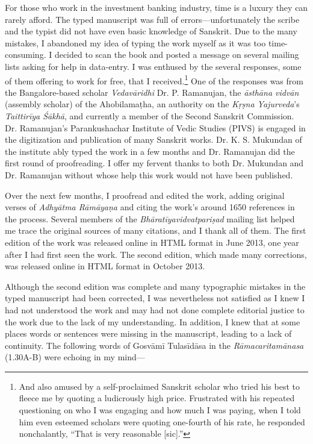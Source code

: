 \begin{sloppypar}\justifying\noindent\hspace{10mm} {\engtextfont For those who work in the investment banking industry, time is a luxury they can rarely afford. The typed manuscript was full of errors—unfortunately the scribe and the typist did not have even basic knowledge of Sanskrit. Due to the many mistakes, I abandoned my idea of typing the work myself as it was too time-consuming. I decided to scan the book and posted a message on several mailing lists asking for help in data-entry. I was enthused by the several responses, some of them offering to work for free, that I received.\footnote{{\engtextfont And also amused by a self-proclaimed Sanskrit scholar who tried his best to fleece me by quoting a ludicrously high price. Frustrated with his repeated questioning on who I was engaging and how much I was paying, when I told him even esteemed scholars were quoting one-fourth of his rate, he responded nonchalantly, “That is very reasonable [sic].”}} One of the responses was from the Bangalore-based scholar \textit{Vedavāridhi} Dr. P. Ramanujan, the \textit{āsthāna vidvān} (assembly scholar) of the Ahobilamaṭha, an authority on the \textit{Kṛṣna Yajurveda}’s \textit{Taittirīya Śākhā}, and currently a member of the Second Sanskrit Commission. Dr. Ramanujan’s Parankushachar Institute of Vedic Studies (PIVS) is engaged in the digitization and publication of many Sanskrit works. Dr. K. S. Mukundan of the institute ably typed the work in a few months and Dr. Ramanujan did the first round of proofreading. I offer my fervent thanks to both Dr. Mukundan and Dr. Ramanujan without whose help this work would not have been published.}\end{sloppypar}
\begin{sloppypar}\justifying\noindent\hspace{10mm} {\engtextfont Over the next few months, I proofread and edited the work, adding original verses of \textit{Adhyātma Rāmāyaṇa} and citing the work’s around 1650 references in the process. Several members of the \textit{Bhāratīyavidvatpariṣad} mailing list helped me trace the original sources of many citations, and I thank all of them. The first edition of the work was released online in HTML format in June 2013, one year after I had first seen the work. The second edition, which made many corrections, was released online in HTML format in October 2013.}\end{sloppypar}
\begin{sloppypar}\justifying\noindent\hspace{10mm} {\engtextfont Although the second edition was complete and many typographic mistakes in the typed manuscript had been corrected, I was nevertheless not satisfied as I knew I had not understood the work and may had not done complete editorial justice to the work due to the lack of my understanding. In addition, I knew that at some places words or sentences were missing in the manuscript, leading to a lack of continuity. The following words of Gosvāmī Tulasīdāsa in the \textit{Rāmacaritamānasa} (1.30A-B) were echoing in my mind—}\end{sloppypar}
